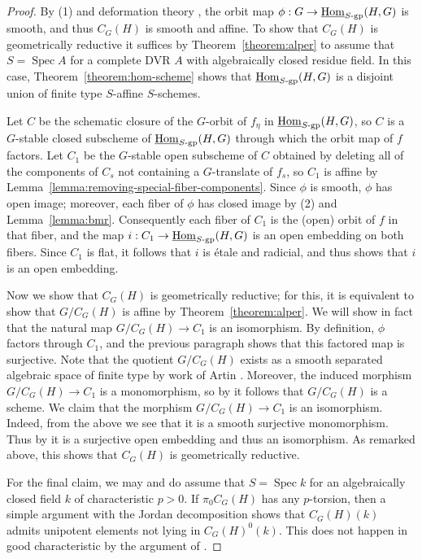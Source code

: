 \documentclass[11pt, letterpaper,english]{amsart}
\theoremstyle{plain}
\theoremstyle{definition}
\numberwithin{equation}{section}
\numberwithin{lem}{section}
\DeclareMathOperator{\Hom}{Hom}
\DeclareMathOperator{\Spec}{Spec}
\begin{document}
\begin{proof}
    By (1) and deformation theory \cite[Exp.\ III, Corollaire 2.8]{sga3}, the orbit map $\phi: G \to \underline{\Hom}_{S\textrm{-}\rm{gp}}(H, G)$ is smooth, and thus $C_G(H)$ is smooth and affine. To show that $C_G(H)$ is geometrically reductive it suffices by Theorem~\ref{theorem:alper} to assume that $S = \Spec A$ for a complete DVR $A$ with algebraically closed residue field. In this case, Theorem~\ref{theorem:hom-scheme} shows that $\underline{\Hom}_{S\textrm{-}\rm{gp}}(H, G)$ is a disjoint union of finite type $S$-affine $S$-schemes.
    
    Let $C$ be the schematic closure of the $G$-orbit of $f_\eta$ in $\underline{\Hom}_{S\textrm{-}\rm{gp}}(H, G)$, so $C$ is a $G$-stable closed subscheme of $\underline{\Hom}_{S\textrm{-}\rm{gp}}(H, G)$ through which the orbit map of $f$ factors. Let $C_1$ be the $G$-stable open subscheme of $C$ obtained by deleting all of the components of $C_s$ not containing a $G$-translate of $f_s$, so $C_1$ is affine by Lemma~\ref{lemma:removing-special-fiber-components}. Since $\phi$ is smooth, $\phi$ has open image; moreover, each fiber of $\phi$ has closed image by (2) and Lemma~\ref{lemma:bmr}. Consequently each fiber of $C_1$ is the (open) orbit of $f$ in that fiber, and the map $i: C_1 \to \underline{\Hom}_{S\textrm{-}\rm{gp}}(H, G)$ is an open embedding on both fibers. Since $C_1$ is flat, it follows that $i$ is \'etale and radicial, and thus \cite[IV\textsubscript{4}, Th\'eor\`eme 17.9.1]{EGA} shows that $i$ is an open embedding.
    
    Now we show that $C_G(H)$ is geometrically reductive; for this, it is equivalent to show that $G/C_G(H)$ is affine by Theorem~\ref{theorem:alper}. We will show in fact that the natural map $G/C_G(H) \to C_1$ is an isomorphism. By definition, $\phi$ factors through $C_1$, and the previous paragraph shows that this factored map is surjective. Note that the quotient $G/C_G(H)$ exists as a smooth separated algebraic space of finite type by work of Artin \cite[Corollary 6.3]{Artin-stacks}. Moreover, the induced morphism $G/C_G(H) \to C_1$ is a monomorphism, so by \cite[II, 6.15]{Knutson-algebraic-spaces} it follows that $G/C_G(H)$ is a scheme. We claim that the morphism $G/C_G(H) \to C_1$ is an isomorphism. Indeed, from the above we see that it is a smooth surjective monomorphism. Thus by \cite[IV\textsubscript{4}, Th\'eor\`eme 17.9.1]{EGA} it is a surjective open embedding and thus an isomorphism. As remarked above, this shows that $C_G(H)$ is geometrically reductive.

    For the final claim, we may and do assume that $S = \Spec k$ for an algebraically closed field $k$ of characteristic $p > 0$. If $\pi_0 C_G(H)$ has any $p$-torsion, then a simple argument with the Jordan decomposition shows that $C_G(H)(k)$ admits unipotent elements not lying in $C_G(H)^0(k)$. This does not happen in good characteristic by the argument of \cite[III, 3.15]{Springer-Steinberg}.
\end{proof}
\end{document}

